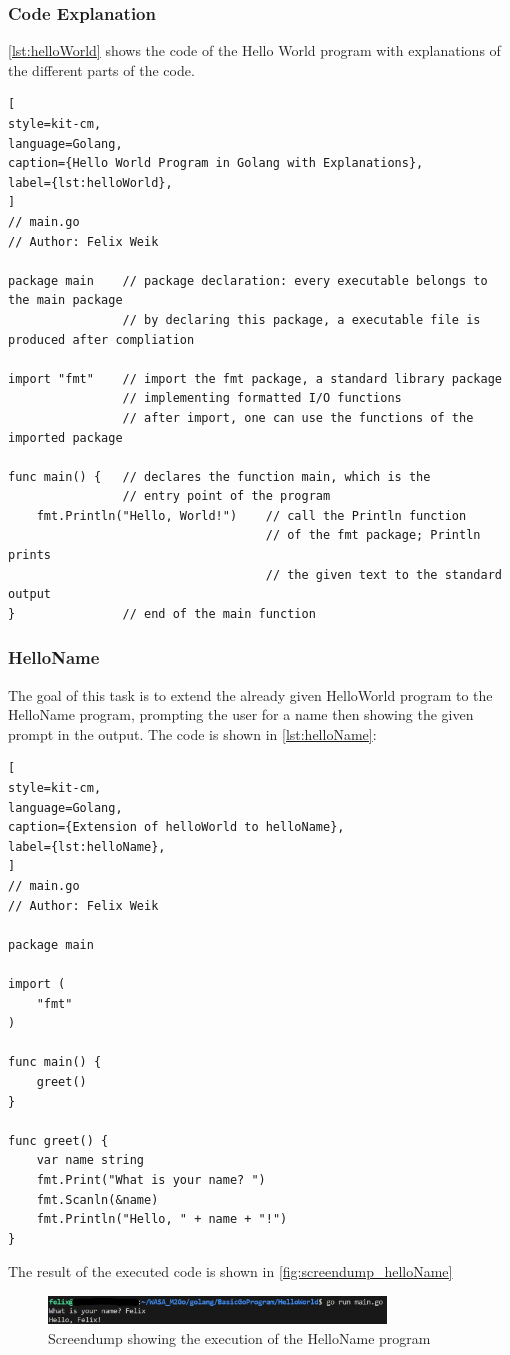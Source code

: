 \subsubsection*{Code Explanation}
\autoref{lst:helloWorld} shows the code of the Hello World program with explanations of the different parts of the code.
\begin{lstlisting}[
style=kit-cm,
language=Golang,
caption={Hello World Program in Golang with Explanations},
label={lst:helloWorld},
]
// main.go 
// Author: Felix Weik

package main    // package declaration: every executable belongs to the main package
                // by declaring this package, a executable file is produced after compliation

import "fmt"    // import the fmt package, a standard library package 
                // implementing formatted I/O functions
                // after import, one can use the functions of the imported package

func main() {   // declares the function main, which is the 
                // entry point of the program
    fmt.Println("Hello, World!")    // call the Println function 
                                    // of the fmt package; Println prints 
                                    // the given text to the standard output
}               // end of the main function

\end{lstlisting}

\subsubsection*{HelloName}
The goal of this task is to extend the already given HelloWorld program to the HelloName program, prompting the user for a name then showing the given prompt in the output.
The code is shown in \autoref{lst:helloName}:
\begin{lstlisting}[
style=kit-cm,
language=Golang,
caption={Extension of helloWorld to helloName},
label={lst:helloName},
]
// main.go
// Author: Felix Weik

package main

import (
    "fmt"
)

func main() {
    greet()
}

func greet() {
    var name string
    fmt.Print("What is your name? ")
    fmt.Scanln(&name)
    fmt.Println("Hello, " + name + "!")
} 
\end{lstlisting}

The result of the executed code is shown in \autoref{fig:screendump_helloName}

\begin{figure}[H]
    \centering
    \includegraphics[width=0.8\textwidth]{figures/goLang/helloWorld/golang_helloWorld_helloName.png}
    \caption{Screendump showing the execution of the HelloName program}
    \label{fig:screendump_helloName}
\end{figure}